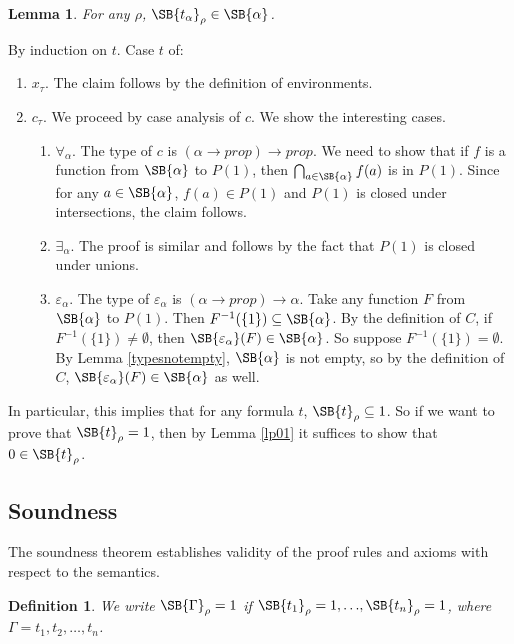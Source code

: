 \documentclass{LMCS}
\newtheorem{definition}[thm]{Definition}
\newtheorem{lemma}[thm]{Lemma}
\newcommand{\g}{\Gamma}
\newcommand{\sr}[1]{\SB{#1}_\rho}
\newcommand{\Prop}{\ensuremath{P(1)}}
\begin{document}
\begin{lemma}\label{lin}
For any $\rho$, $\SB{t_\alpha}_\rho \in \SB{\alpha}$. 
\end{lemma}
By induction on $t$. Case $t$ of:
\begin{enumerate}[$\bullet$]
\item $x_\tau$. The claim follows by the definition of environments. 
\item $c_\tau$. We proceed by case analysis of $c$. We show the interesting
cases. 
\begin{enumerate}[$-$]
\item $\forall_\alpha$. The type of $c$ is $(\alpha \to prop) \to prop$.
We need to show that if $f$ is a function from $\SB{\alpha}$ to $\Prop$,
then $\bigcap_{a \in \SB{\alpha}} f(a)$ is in $\Prop$. Since for any $a \in
\SB{\alpha}$, $f(a) \in \Prop$ and $\Prop$ is closed under intersections,
the claim follows.
\item $\exists_\alpha$. The proof is similar and follows by the fact that $\Prop$ is closed
under unions.
\item $\varepsilon_\alpha$. The type of $\varepsilon_\alpha$ is $(\alpha \to prop) \to
\alpha$. Take any function $F$ from $\SB{\alpha}$ to $\Prop$. Then $F^{-1}(\{1\})
\subseteq \SB{\alpha}$. By the definition of $C$, if $F^{-1}(\{1\}) \neq
\emptyset$, then $\SB{\varepsilon_\alpha}(F) \in \SB{\alpha}$. So suppose 
$F^{-1}(\{1\}) = \emptyset$. By Lemma \ref{typesnotempty}, $\SB{\alpha}$ is
not empty, so by the definition of $C$, $\SB{\varepsilon_\alpha}(F) \in \SB{\alpha}$ as well. 
\end{enumerate}
\end{enumerate}

In particular, this implies that for any formula $t$, $\sr{t} \subseteq 1$. 
So if we want to prove that $\sr{t} = 1$, then by Lemma \ref{lp01} it
suffices to show that $0 \in \sr{t}$.

\subsection{Soundness}

The soundness theorem establishes validity of the proof rules and axioms with respect to the semantics.

\begin{definition}
We write $\SB{\g}_\rho = 1$ if $\SB{t_1}_\rho = 1, {\ldots} , 
\SB{t_n}_\rho = 1$,  where $\g = t_1, t_2, {\ldots} , t_n$.
\end{definition}
\end{document}
